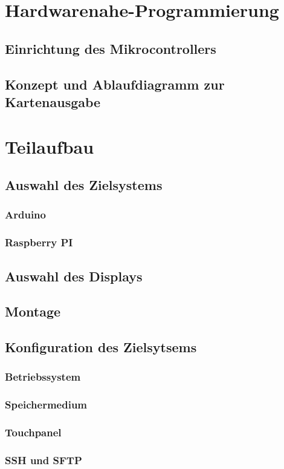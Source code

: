 \section{Hardwarenahe-Programmierung}
\subsection{Einrichtung des Mikrocontrollers}
\subsection{Konzept und Ablaufdiagramm zur Kartenausgabe}
\section{Teilaufbau}
\subsection{Auswahl des Zielsystems}
\subsubsection{Arduino}
\subsubsection{Raspberry PI}
\subsection{Auswahl des Displays}
\subsection{Montage}
\subsection{Konfiguration des Zielsytsems}
\subsubsection{Betriebssystem}
\subsubsection{Speichermedium}
\subsubsection{Touchpanel}
\subsubsection{SSH und SFTP}
